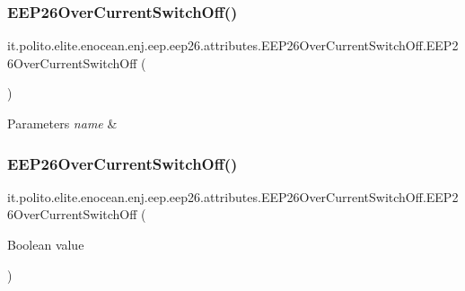 \subsubsection{\texorpdfstring{E\+E\+P26\+Over\+Current\+Switch\+Off()}{EEP26OverCurrentSwitchOff()}\hspace{0.1cm}{\footnotesize\ttfamily [1/2]}}
{\footnotesize\ttfamily it.\+polito.\+elite.\+enocean.\+enj.\+eep.\+eep26.\+attributes.\+E\+E\+P26\+Over\+Current\+Switch\+Off.\+E\+E\+P26\+Over\+Current\+Switch\+Off (\begin{DoxyParamCaption}{ }\end{DoxyParamCaption})}


\begin{DoxyParams}{Parameters}
{\em name} & \\
\hline
\end{DoxyParams}
\hypertarget{classit_1_1polito_1_1elite_1_1enocean_1_1enj_1_1eep_1_1eep26_1_1attributes_1_1_e_e_p26_over_current_switch_off_ae4740fc492d02b1c78d9e225986dcf84}{}\label{classit_1_1polito_1_1elite_1_1enocean_1_1enj_1_1eep_1_1eep26_1_1attributes_1_1_e_e_p26_over_current_switch_off_ae4740fc492d02b1c78d9e225986dcf84} 
\subsubsection{\texorpdfstring{E\+E\+P26\+Over\+Current\+Switch\+Off()}{EEP26OverCurrentSwitchOff()}\hspace{0.1cm}{\footnotesize\ttfamily [2/2]}}
{\footnotesize\ttfamily it.\+polito.\+elite.\+enocean.\+enj.\+eep.\+eep26.\+attributes.\+E\+E\+P26\+Over\+Current\+Switch\+Off.\+E\+E\+P26\+Over\+Current\+Switch\+Off (\begin{DoxyParamCaption}\item[{Boolean}]{value }\end{DoxyParamCaption})}



